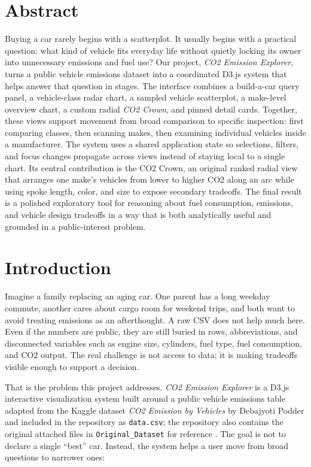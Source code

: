 \documentclass[12pt,letterpaper]{article}
\begin{document}
\hypersetup{pageanchor=false}


\tableofcontents
\clearpage
\hypersetup{pageanchor=true}
\setcounter{page}{1}

\section*{Abstract}
Buying a car rarely begins with a scatterplot. It usually begins with a practical question: what kind of vehicle fits everyday life without quietly locking its owner into unnecessary emissions and fuel use? Our project, \emph{CO2 Emission Explorer}, turns a public vehicle emissions dataset into a coordinated D3.js system that helps answer that question in stages. The interface combines a build-a-car query panel, a vehicle-class radar chart, a sampled vehicle scatterplot, a make-level overview chart, a custom radial \emph{CO2 Crown}, and pinned detail cards. Together, these views support movement from broad comparison to specific inspection: first comparing classes, then scanning makes, then examining individual vehicles inside a manufacturer. The system uses a shared application state so selections, filters, and focus changes propagate across views instead of staying local to a single chart. Its central contribution is the CO2 Crown, an original ranked radial view that arranges one make's vehicles from lower to higher CO2 along an arc while using spoke length, color, and size to expose secondary tradeoffs. The final result is a polished exploratory tool for reasoning about fuel consumption, emissions, and vehicle design tradeoffs in a way that is both analytically useful and grounded in a public-interest problem.

\section{Introduction}
Imagine a family replacing an aging car. One parent has a long weekday commute, another cares about cargo room for weekend trips, and both want to avoid treating emissions as an afterthought. A raw CSV does not help much here. Even if the numbers are public, they are still buried in rows, abbreviations, and disconnected variables such as engine size, cylinders, fuel type, fuel consumption, and CO2 output. The real challenge is not access to data; it is making tradeoffs visible enough to support a decision.

That is the problem this project addresses. \emph{CO2 Emission Explorer} is a D3.js interactive visualization system built around a public vehicle emissions table adapted from the Kaggle dataset \emph{CO2 Emission by Vehicles} by Debajyoti Podder and included in the repository as \texttt{data.csv}; the repository also contains the original attached files in \texttt{Original\_Dataset} for reference \cite{kaggledataset,dataset,originalcsv,datadescription}. The goal is not to declare a single ``best'' car. Instead, the system helps a user move from broad questions to narrower ones:
\end{document}

